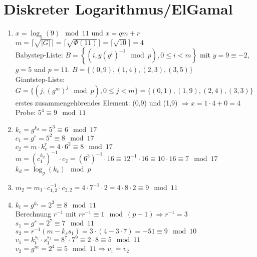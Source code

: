 \documentclass{article}
\begin{document}
	\section*{Diskreter Logarithmus/ElGamal}
	\begin{enumerate}[label=(\alph*)]
		\item $x = \log_5(9)\mod 11$ und $x = qm + r$ \\
		$m = \lceil\sqrt{\vert G\vert}\rceil = \lceil\sqrt{\Phi(11)}\rceil = \lceil\sqrt{10}\rceil = 4$ \\ Babystep-Liste: $B = \left\lbrace\left(i,y(g^i)^{-1}\mod p\right), 0\le i <m\right\rbrace$ mit $y=9 \equiv -2$, $g=5$ und $p=11$. $B=\{(0, 9), (1,4), (2,3), (3,5)\}$ \\
		Giantstep-Liste: $G=\{(j, (g^m)^j \mod p), 0\le j<m\} = \{(0,1), (1,9), (2,4), (3,3)\}$ \\
		erstes zusammengehörendes Element: (0,9) und (1,9) $\Rightarrow x = 1\cdot 4 + 0 = 4$ \\
		Probe: $5^4 \equiv 9 \mod 11$
		\item $k_e = g^{k_d} = 5^3 \equiv 6 \mod 17$ \\
		$c_1 = g^r = 5^2 \equiv 8 \mod 17$ \\
		$c_2 = m\cdot k_e^r = 4\cdot 6^2 \equiv 8 \mod 17$ \\
		$m = (c_1^{k_d})^{-1}\cdot c_2 = (6^3)^{-1}\cdot 16 \equiv 12^{-1}\cdot 16 \equiv 10\cdot 16 \equiv 7 \mod 17$ \\
		$k_d = \log_g(k_e) \mod p$
		\item $m_2 = m_1\cdot c_{1,2}^{-1} \cdot c_{2,2} = 4 \cdot 7^{-1}\cdot 2 = 4\cdot 8\cdot 2 \equiv 9 \mod 11$
		\item $k_t = g^{k_s} = 2^3 \equiv 8\mod 11$ \\
		Berechnung $r^{-1}$ mit $rr^{-1} \equiv 1\mod (p-1) \Rightarrow r^{-1} = 3$
		$s_1 = g^r = 2^7 \equiv 7 \mod 11$ \\
		$s_2 = r^{-1}(m - k_ss_1) = 3\cdot (4 - 3\cdot 7) = -51 \equiv 9 \mod 10$ \\
		$v_1 = k_t^{s_1}\cdot s_1^{s_2} = 8^7\cdot 7^9 \equiv 2\cdot 8 \equiv 5 \mod 11$ \\
		$v_2 = g^m = 2^4 \equiv 5 \mod 11 \Rightarrow v_1 = v_2$
	\end{enumerate}
\end{document}
